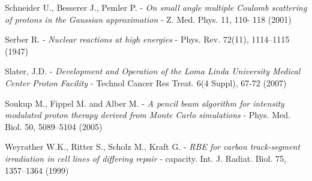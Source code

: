 \documentclass[12pt, a4paper, twoside]{book}
\begin{document}
\begin{thebibliography}{99}
Schneider U., Besserer J., Pemler P. - 
\emph{On small angle multiple Coulomb scattering of protons in the Gaussian approximation} - 
Z. Med. Phys. 11,  110- 118 (2001)

Serber R. - 
\emph{Nuclear reactions at high energies} -
Phys. Rev. 72(11), 1114–1115 (1947)

Slater, J.D. -
\emph{Development and Operation of the Loma Linda University Medical Center Proton Facility} -
Technol Cancer Res Treat. 6(4 Suppl), 67-72 (2007)

Soukup M., Fippel M. and Alber M. -
\emph{A pencil beam algorithm for intensity modulated proton therapy derived from Monte Carlo simulations} -
Phys. Med. Biol. 50, 5089–5104 (2005)


Weyrather W.K., Ritter S., Scholz M., Kraft G. - 
\emph{RBE for carbon track-segment irradiation in cell lines of differing repair} -
capacity. Int. J. Radiat. Biol. 75, 1357–1364 (1999)




\end{thebibliography}




\end{document}
